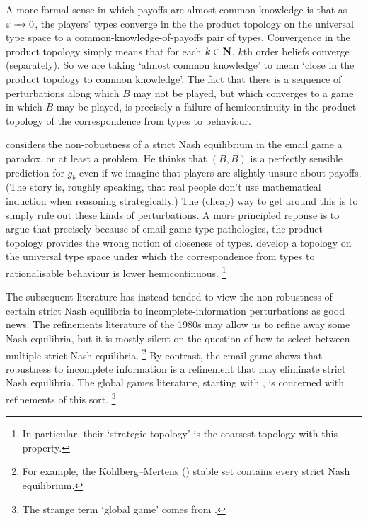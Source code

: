 \documentclass[11pt,letterpaper,reqno,oneside]{article}
\begin{document}
A more formal sense in which payoffs are almost common knowledge is that as $\varepsilon \xrightarrow{\;\;\;} 0$, the players' types converge in the the product topology on the universal type space to a common-knowledge-of-payoffs pair of types. Convergence in the product topology simply means that for each $k \in \mathbf{N}$, $k$th order beliefs converge (separately). So we are taking `almost common knowledge' to mean `close in the product topology to common knowledge'. The fact that there is a sequence of perturbations along which $B$ may not be played, but which converges to a game in which $B$ may be played, is precisely a failure of hemicontinuity in the product topology of the correspondence from types to behaviour.


\textcite{Rubinstein1989} considers the non-robustness of a strict Nash equilibrium in the email game a paradox, or at least a problem. He thinks that $(B,B)$ is a perfectly sensible prediction for $g_b$ even if we imagine that players are slightly unsure about payoffs. (The story is, roughly speaking, that real people don't use mathematical induction when reasoning strategically.) The (cheap) way to get around this is to simply rule out these kinds of perturbations. A more principled reponse is to argue that precisely because of email-game-type pathologies, the product topology provides the wrong notion of closeness of types. \textcite{DekelFudenbergMorris2006} develop a topology on the universal type space under which the correspondence from types to rationalisable behaviour is lower hemicontinuous.%
	\footnote{In particular, their `strategic topology' is the coarsest topology with this property.}


The subsequent literature has instead tended to view the non-robustness of certain strict Nash equilibria to incomplete-information perturbations as good news. The refinements literature of the 1980s may allow us to refine away some Nash equilibria, but it is mostly silent on the question of how to select between multiple strict Nash equilibria.%
	\footnote{For example, the Kohlberg--Mertens (\citeyear{KohlbergMertens1986}) stable set contains every strict Nash equilibrium.}
By contrast, the email game shows that robustness to incomplete information is a refinement that may eliminate strict Nash equilibria. The global games literature, starting with \textcite{CarlssonVandamme1993}, is concerned with refinements of this sort.%
	\footnote{The strange term `global game' comes from \textcite{CarlssonVandamme1993}.}


\end{document}

